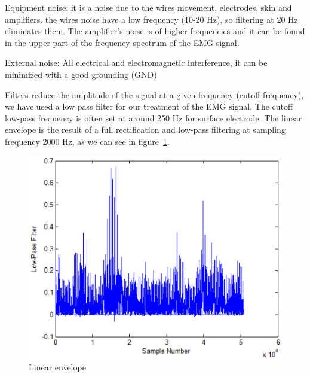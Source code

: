\documentclass[conference]{IEEEtran}
\begin{document}
Equipment noise: it is a noise due to the wires movement, electrodes, skin and amplifiers. the wires noise have a low frequency (10-20 Hz), so filtering at 20 Hz eliminates them. The amplifier's noise is of higher frequencies and it can be found in the upper part of the frequency spectrum of the EMG signal.\par

External noise: All electrical and electromagnetic interference, it can be minimized with a good grounding (GND)

Filters reduce the amplitude of the signal at a given frequency (cutoff frequency), we have used a low pass filter for our treatment of the EMG signal. The cutoff low-pass frequency is often set at around 250 Hz for surface electrode. The linear envelope is the result of a full rectification and low-pass filtering at sampling frequency 2000 Hz, as we can see in figure~\ref{fig:env}.\par

\begin{figure}
    \hspace*{1.2 cm}
    \includegraphics[scale=0.40]{Figures/fig3.eps}
    \caption{Linear envelope}
    \label{fig:env}
\end{figure}

\end{document}

